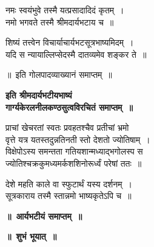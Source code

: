 \documentclass[11pt, openany]{book}
\begin{document}
\begin{center}
{\qt नमः स्वयंभुवे तस्मै यत्प्रसादादिदं कृतम्~।\\
	नमो भगवते तस्मै श्रीमदार्यभटाय च~॥
	
शिष्यं तत्त्वेन विचार्याचार्यभटसूत्रभाष्यमिदम्~।\\
यदि स न्यायाल्लिप्सेदस्मै दातव्यमेव शङ्कर ते~॥}
\end{center} 
	
\begin{center}	
 ॥~इति गोलपादव्याख्यानं समाप्तम्~॥ 
\end{center}

\begin{center}
\textbf{इति श्रीमदार्यभटीयभाष्यं\\
	गार्ग्यकेरलनीलकण्ठसुत्वविरचितं समाप्तम्~॥} 
\end{center}
 

 \begin{center} 
{\qt प्राचां खेचरतां स्वतः प्रवहतश्चैव प्रतीचां भ्रमो\\
वृत्ते यत्र यतस्तदुन्नतिनती स्तो देशतो ज्योतिषाम्~।\\
विक्षेपोऽस्य समन्तता गतियशान्मध्याद्भगोलस्प स\\
ज्योतिश्चक्रकुमध्यमर्कशशिनोरूर्ध्वं परेषां ततः~॥
 
 देशे महति काले वा स्फुटार्थं यस्य दर्शनम्~।\\
सूत्रकाराय तस्मै स्तान्नमो भाष्यकृतेऽपि च~॥} 
\end{center} 

	\begin{center}
	  
	\textbf{॥~आर्यभटीयं समाप्तम्~॥}
	
\vspace{2mm}
\textbf{॥~शुभं भूयात्~॥}
	\end{center}

\afterpage{\fancyhead[CE] {}}
\afterpage{\fancyhead[CO]{}}
\afterpage{\fancyhead[LE,RO]{\thepage}}
\cfoot{}

\newpage
\end{document}
